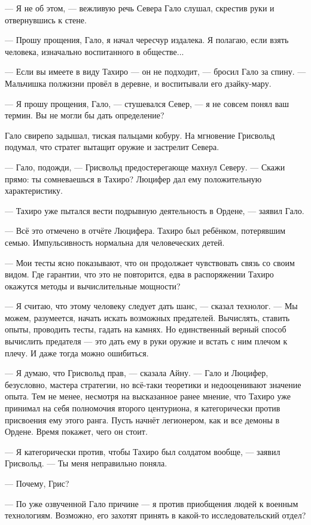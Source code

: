 --- Я не об этом, --- вежливую речь Севера Гало слушал, скрестив руки и отвернувшись к стене.

--- Прошу прощения, Гало, я начал чересчур издалека.
Я полагаю, если взять человека, изначально воспитанного в обществе...

--- Если вы имеете в виду Тахиро --- он не подходит, --- бросил Гало за спину.
--- Мальчишка полжизни провёл в деревне, и воспитывали его дзайку-мару.

--- Я прошу прощения, Гало, --- стушевался Север, --- я не совсем понял ваш термин.
Вы не могли бы дать определение?

Гало свирепо задышал, тиская пальцами кобуру.
На мгновение Грисвольд подумал, что стратег вытащит оружие и застрелит Севера.

--- Гало, подожди, --- Грисвольд предостерегающе махнул Северу.
--- Скажи прямо: ты сомневаешься в Тахиро?
Люцифер дал ему положительную характеристику.

--- Тахиро уже пытался вести подрывную деятельность в Ордене, --- заявил Гало.

--- Всё это отмечено в отчёте Люцифера.
Тахиро был ребёнком, потерявшим семью.
Импульсивность нормальна для человеческих детей.

--- Мои тесты ясно показывают, что он продолжает чувствовать связь со своим видом.
Где гарантии, что это не повторится, едва в распоряжении Тахиро окажутся методы и вычислительные мощности?

--- Я считаю, что этому человеку следует дать шанс, --- сказал технолог.
--- Мы можем, разумеется, начать искать возможных предателей.
Вычислять, ставить опыты, проводить тесты, гадать на камнях.
Но единственный верный способ вычислить предателя --- это дать ему в руки оружие и встать с ним плечом к плечу.
И даже тогда можно ошибиться.

--- Я думаю, что Грисвольд прав, --- сказала Айну.
--- Гало и Люцифер, безусловно, мастера стратегии, но всё-таки теоретики и недооценивают значение опыта.
Тем не менее, несмотря на высказанное ранее мнение, что Тахиро уже принимал на себя полномочия второго центуриона, я категорически против присвоения ему этого ранга.
Пусть начнёт легионером, как и все демоны в Ордене.
Время покажет, чего он стоит.

--- Я категорически против, чтобы Тахиро был солдатом вообще, --- заявил Грисвольд.
--- Ты меня неправильно поняла.

--- Почему, Грис?

--- По уже озвученной Гало причине --- я против приобщения людей к военным технологиям.
Возможно, его захотят принять в какой-то исследовательский отдел?

